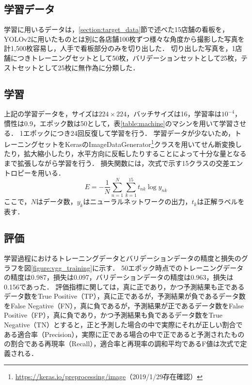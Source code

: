   \subsection{学習データ}
    学習に用いるデータは，\ref{section:target_data}節で述べた15店舗の看板を，YOLOv2に用いたものとは別に各店舗100枚ずつ様々な角度から撮影した写真を計1,500枚容易し，人手で看板部分のみを切り出した．
    切り出した写真を，1店舗につきトレーニングセットとして50枚，バリデーションセットとして25枚，テストセットとして25枚に無作為に分類した．
    
  \subsection{学習}
    上記の学習データを，サイズは$224 \times 224$，バッチサイズは16，学習率は$10^{-4}$，慣性は0.9，エポック数は50として，表\ref{table:machine}のマシンを用いて学習させる．
    1エポックにつき24回反復して学習を行う．
    学習データが少ないため，トレーニングセットをKerasのImageDataGenerator\footnote{\url{https://keras.io/preprocessing/image}（2019/1/29存在確認）}クラスを用いてせん断変換したり，拡大縮小したり，水平方向に反転したりすることによって十分な量となるまで拡張しながら学習を行う．
    損失関数には，次式で示す15クラスの交差エントロピーを用いる．
    \begin{equation}
      E = -\frac{1}{N} \sum_{n=1}^{N} \sum_{k=1}^{15} t_{nk} \log y_{nk}
    \end{equation}
    ここで，$N$はデータ数，$y_k$はニューラルネットワークの出力，$t_k$は正解ラベルを表す．

  \subsection{評価}
    学習過程におけるトレーニングデータとバリデーションデータの精度と損失のグラフを図\ref{figure:vgg_training}に示す．
    50エポック時点でのトレーニングデータの精度は0.987，損失は0.097，バリデーションデータの精度は0.963，損失は0.156であった．
    評価指標に関しては，真に正であり，かつ予測結果も正であるデータ数をTrue Positive（TP），真に正であるが，予測結果が負であるデータ数をFalse Negative（FN），真に負であるが，予測結果が正であるデータ数をFalse Positive（FP），真に負であり，かつ予測結果も負であるデータ数をTrue Negative（TN）とすると，正と予測した場合の中で実際にそれが正しい割合である適合率（Precision），実際に正である場合の中で正であると予測されたものの割合である再現率（Recall），適合率と再現率の調和平均であるF値は次式で定義される\cite{Richert:2013}．

